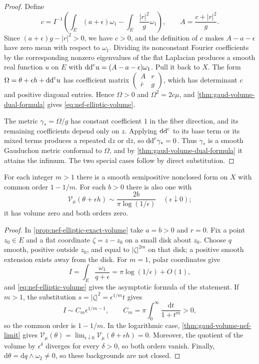 \begin{proof}
Define
\[
 c=I^{-1}\left(\int_E(a+\epsilon)\omega_1-
 \int_E\frac{|r|^2}{g}\omega_1\right),\qquad
 A=\frac{c+|r|^2}{g}.
\]
Since $(a+\epsilon)g-|r|^2>0$, we have $c>0$, and the definition of $c$ makes $A-a-\epsilon$ have zero mean with respect to $\omega_1$. Dividing its nonconstant Fourier coefficients by the corresponding nonzero eigenvalues of the flat Laplacian produces a smooth real function $u$ on $E$ with $\mathrm{dd}^{\mathrm{c}} u=(A-a-\epsilon)\omega_1$. Pull it back to $X$. The form $\Omega=\theta+\epsilon h+\mathrm{dd}^{\mathrm{c}} u$ has coefficient matrix $\left(\begin{smallmatrix}A&r\\\bar r&g\end{smallmatrix}\right)$, which has determinant $c$ and positive diagonal entries. Hence $\Omega>0$ and $\Omega^2=2c\mu$, and \cref{thm:gaud-volume-dual-formula} gives \eqref{eq:nef-elliptic-volume}.

The metric $\gamma_*=\Omega/g$ has constant coefficient $1$ in the fiber direction, and its remaining coefficients depend only on $z$. Applying $\mathrm{dd}^{\mathrm{c}}$ to its base term or its mixed terms produces a repeated $\mathrm{d} z$ or $\mathrm{d}\bar z$, so $\mathrm{dd}^{\mathrm{c}}\gamma_*=0$. Thus $\gamma_*$ is a smooth Gauduchon metric conformal to $\Omega$, and by \cref{thm:gaud-volume-dual-formula} it attains the infimum. The two special cases follow by direct substitution.
\end{proof}

\begin{proposition}\label{prop:nef-diagonal-fractional-and-zero}
For each integer $m>1$ there is a smooth semipositive nonclosed form on $X$ with common order $1-1/m$. For each $b>0$ there is also one with
\[
 \mathcal V_\mu(\theta+\epsilon h)\sim\frac{2b}{\pi\log(1/\epsilon)}
 \quad(\epsilon\downarrow0);
\]
it has volume zero and both orders zero.
\end{proposition}

\begin{proof}
In \cref{prop:nef-elliptic-exact-volume} take $a=b>0$ and $r=0$. Fix a point $z_0\in E$ and a flat coordinate $\zeta=z-z_0$ on a small disk about $z_0$. Choose $q$ smooth, positive outside $z_0$, and equal to $|\zeta|^{2m}$ on that disk; a positive smooth extension exists away from the disk. For $m=1$, polar coordinates give
\[
 I=\int_E\frac{\omega_1}{q+\epsilon}
   =\pi\log(1/\epsilon)+O(1),
\]
and \eqref{eq:nef-elliptic-volume} gives the asymptotic formula of the statement. If $m>1$, the substitution $s=|\zeta|^2=\epsilon^{1/m}t$ gives
\[
 I\sim C_m\epsilon^{1/m-1},\qquad
 C_m=\pi\int_0^\infty\frac{\mathrm{d} t}{1+t^m}>0,
\]
so the common order is $1-1/m$. In the logarithmic case, \cref{thm:gaud-volume-nef-limit} gives $\mathcal V_\mu(\theta)=\lim_{\epsilon\downarrow0}\mathcal V_\mu(\theta+\epsilon h)=0$. Moreover, the quotient of the volume by $\epsilon^\delta$ diverges for every $\delta>0$, so both orders vanish. Finally, $\mathrm{d}\theta=\mathrm{d} q\wedge\omega_2\ne0$, so these backgrounds are not closed.
\end{proof}

